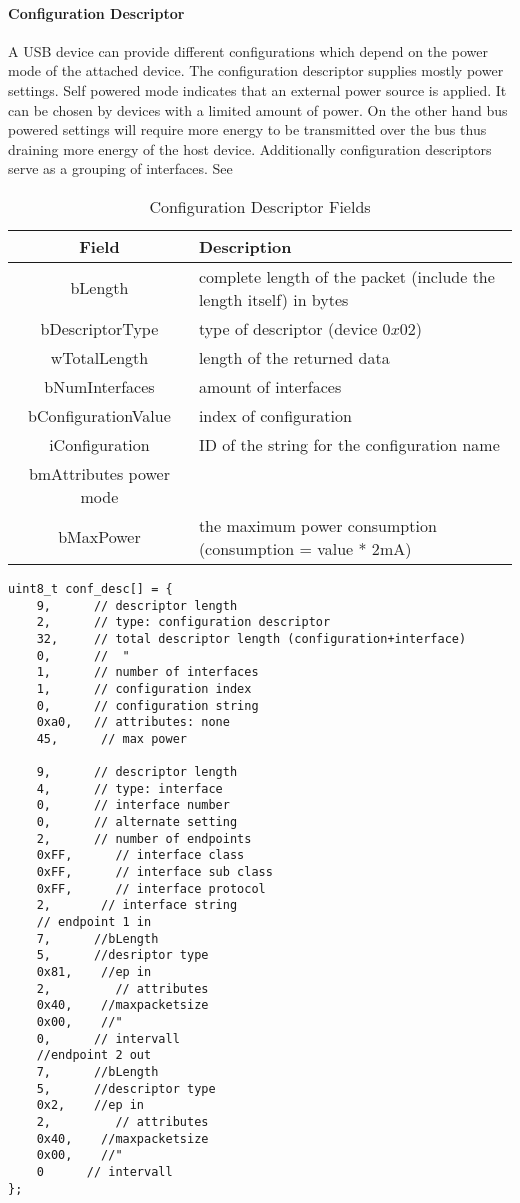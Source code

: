 \paragraph{Configuration Descriptor}
A USB device can provide different configurations which depend on the power mode of the attached device. The configuration descriptor supplies mostly 
power settings. Self powered mode indicates that an external power source is applied. It can be chosen by devices with a limited amount of power. On 
the other hand bus powered settings will require more energy to be transmitted over the bus thus draining more energy of the host device. Additionally 
configuration descriptors serve as a grouping of interfaces. See %

\begin{table}[h!]
\begin{tabular}{c|p{8cm}} 
Field & Description \\ \hline
bLength & complete length of the packet (include the length itself) in bytes \\
bDescriptorType & type of descriptor (device $0x02$)\\
wTotalLength & length of the returned data \\
bNumInterfaces & amount of interfaces\\
bConfigurationValue & index of configuration \\
iConfiguration & ID of the string for the configuration name\\
bmAttributes  power mode\\
bMaxPower & the maximum power consumption (consumption = value * $2$mA) \\
\end{tabular}
 \caption[Table]{Configuration Descriptor Fields}
 \label{tab:configurationdescriptor}
\end{table}
\begin{minipage}{0.3\textwidth}
\begin{verbatim}
uint8_t conf_desc[] = {
	9,      // descriptor length
	2,      // type: configuration descriptor
	32,     // total descriptor length (configuration+interface)
	0,      //  "
	1,      // number of interfaces
	1,      // configuration index
	0,      // configuration string
	0xa0,   // attributes: none
	45,      // max power
	
	9,      // descriptor length
	4,      // type: interface
	0,      // interface number
	0,      // alternate setting
	2,      // number of endpoints
	0xFF,      // interface class
	0xFF,      // interface sub class
	0xFF,      // interface protocol
	2,       // interface string
	// endpoint 1 in
	7,      //bLength
	5,      //desriptor type
	0x81,    //ep in
	2,         // attributes
	0x40,    //maxpacketsize
	0x00,    //"
	0,      // intervall
	//endpoint 2 out
	7,      //bLength
	5,      //descriptor type
	0x2,    //ep in
	2,         // attributes
	0x40,    //maxpacketsize
	0x00,    //"
	0      // intervall
}; 
\end{verbatim}
\end{minipage}

